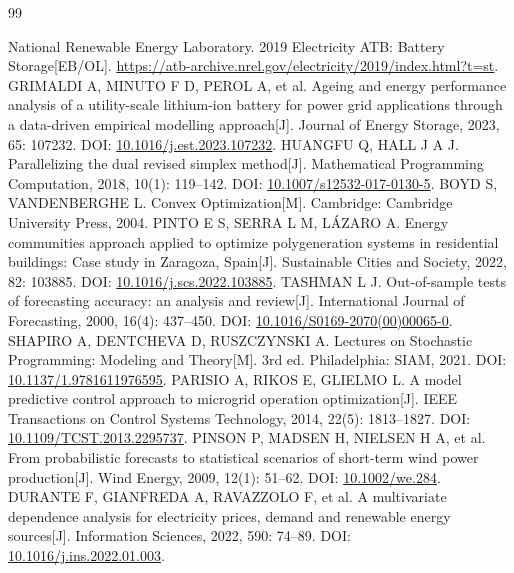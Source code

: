 \begin{thebibliography}{99}
\raggedright
\small
\setlength{\itemsep}{0pt}
\setlength{\parsep}{0pt}
 National Renewable Energy Laboratory. 2019 Electricity ATB: Battery Storage[EB/OL]. \url{https://atb-archive.nrel.gov/electricity/2019/index.html?t=st}.
 GRIMALDI A, MINUTO F D, PEROL A, et al. Ageing and energy performance analysis of a utility-scale lithium-ion battery for power grid applications through a data-driven empirical modelling approach[J]. Journal of Energy Storage, 2023, 65: 107232. DOI: \url{10.1016/j.est.2023.107232}.
 HUANGFU Q, HALL J A J. Parallelizing the dual revised simplex method[J]. Mathematical Programming Computation, 2018, 10(1): 119--142. DOI: \url{10.1007/s12532-017-0130-5}.
 BOYD S, VANDENBERGHE L. Convex Optimization[M]. Cambridge: Cambridge University Press, 2004.
 PINTO E S, SERRA L M, LÁZARO A. Energy communities approach applied to optimize polygeneration systems in residential buildings: Case study in Zaragoza, Spain[J]. Sustainable Cities and Society, 2022, 82: 103885. DOI: \url{10.1016/j.scs.2022.103885}.
 TASHMAN L J. Out-of-sample tests of forecasting accuracy: an analysis and review[J]. International Journal of Forecasting, 2000, 16(4): 437--450. DOI: \url{10.1016/S0169-2070(00)00065-0}.
 SHAPIRO A, DENTCHEVA D, RUSZCZYNSKI A. Lectures on Stochastic Programming: Modeling and Theory[M]. 3rd ed. Philadelphia: SIAM, 2021. DOI: \url{10.1137/1.9781611976595}.
 PARISIO A, RIKOS E, GLIELMO L. A model predictive control approach to microgrid operation optimization[J]. IEEE Transactions on Control Systems Technology, 2014, 22(5): 1813--1827. DOI: \url{10.1109/TCST.2013.2295737}.
 PINSON P, MADSEN H, NIELSEN H A, et al. From probabilistic forecasts to statistical scenarios of short-term wind power production[J]. Wind Energy, 2009, 12(1): 51--62. DOI: \url{10.1002/we.284}.
 DURANTE F, GIANFREDA A, RAVAZZOLO F, et al. A multivariate dependence analysis for electricity prices, demand and renewable energy sources[J]. Information Sciences, 2022, 590: 74--89. DOI: \url{10.1016/j.ins.2022.01.003}.
\end{thebibliography}
